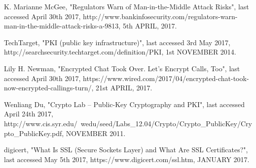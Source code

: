 \documentclass[12pt]{extarticle}
\begin{document}
\pagebreak


\begin{thebibliography}{99}




K. Marianne McGee, "Regulators Warn of Man-in-the-Middle Attack Risks", last accessed April 30th 2017, http://www.bankinfosecurity.com/regulators-warn-man-in-the-middle-attack-risks-a-9813, 5th APRIL, 2017.


TechTarget, "PKI (public key infrastructure)", last accessed 3rd May 2017, http://searchsecurity.techtarget.com/definition/PKI, 1st NOVEMBER 2014.


Lily H. Newman, "Encrypted Chat Took Over. Let’s Encrypt Calls, Too", last accessed April 30th 2017, https://www.wired.com/2017/04/encrypted-chat-took-now-encrypted-callings-turn/, 21st APRIL, 2017.


Wenliang Du, "Crypto Lab – Public-Key Cryptography and PKI", last accessed April 24th 2017, http://www.cis.syr.edu/~wedu/seed/Labs\_12.04/Crypto/Crypto\_PublicKey/Crypto\_PublicKey.pdf, NOVEMBER 2011.


digicert, "What Is SSL (Secure Sockets Layer) and What Are SSL Certificates?", last accessed May 5th 2017, https://www.digicert.com/ssl.htm, JANUARY 2017.


\end{thebibliography}
\end{document}
